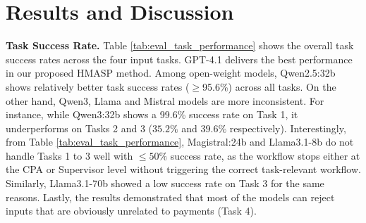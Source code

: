 \documentclass[runningheads]{llncs}
\begin{document}
\section{Results and Discussion}

\noindent\textbf{Task Success Rate.}
Table \ref{tab:eval_task_performance} shows the overall task success rates across the four input tasks. GPT-4.1 delivers the best performance in our proposed HMASP method. Among open-weight models, Qwen2.5:32b shows relatively better task success rates ($\ge$95.6\%) across all tasks. On the other hand, Qwen3, Llama and Mistral models are more inconsistent. For instance, while Qwen3:32b shows a 99.6\% success rate on Task 1, it underperforms on Tasks 2 and 3 ($35.2\%$ and $39.6\%$ respectively). 
Interestingly, from Table \ref{tab:eval_task_performance}, Magistral:24b and Llama3.1-8b do not handle Tasks 1 to 3 well with $\le50\%$ success rate, as the workflow stops either at the CPA or Supervisor level without triggering the correct task-relevant workflow. Similarly, Llama3.1-70b showed a low success rate on Task 3 for the same reasons. Lastly, the results demonstrated that most of the models can reject inputs that are obviously unrelated to payments (Task 4).\\
\end{document}
